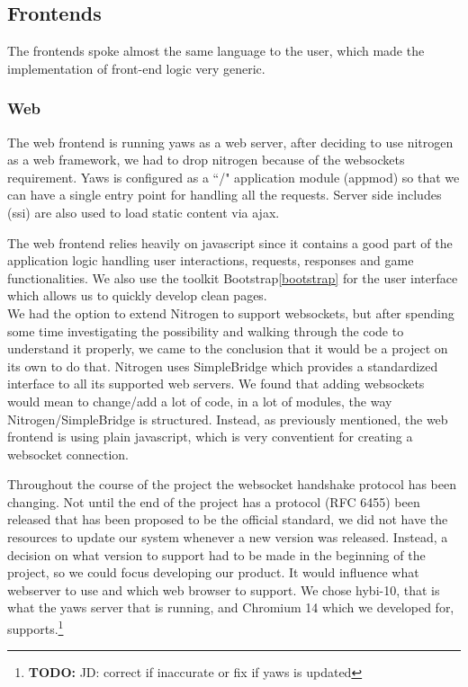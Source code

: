 \documentclass[11pt,a4paper]{report}
\newcommand{\todo}[1]{\footnote{{\color{red} {\bf TODO:} #1}}}
\begin{document}
\subsection{Frontends}
\label{sec:frontends}
The frontends spoke almost the same language to the user, which made the
implementation of front-end logic very generic.

\subsubsection{Web}
The web frontend is running yaws as a web server, after deciding to use nitrogen
as a web framework, we had to drop nitrogen because of the websockets
requirement. Yaws is configured as a ``/" application module (appmod) so that we can have a single entry point for handling all the requests. Server side includes (ssi) are also used to load static content via ajax.

The web frontend relies heavily on javascript since it contains a good part of the application logic handling user interactions, requests, responses and game functionalities. We also use the toolkit Bootstrap\ref{bootstrap} for the user interface which allows us to quickly develop clean pages.\\

We had the option to extend Nitrogen to support websockets, but after spending
some time investigating the possibility and walking through the code to
understand it properly, we came to the conclusion that it would be a project on
its own to do that. Nitrogen uses SimpleBridge which provides a standardized
interface to all its supported web servers. We found that adding websockets
would mean to change/add a lot of code, in a lot of modules, the way
Nitrogen/SimpleBridge is structured. Instead, as previously mentioned, the web
frontend is using plain javascript, which is very conventient for creating a
websocket connection.

Throughout the course of the project the websocket handshake protocol has
been changing.
Not until the end of the project has a protocol (RFC 6455) been released that
has been proposed to be the official standard, we did not have the resources
to update our system whenever a new version was released. Instead, a decision
on what version to support had to be made in the beginning of the project, so we
could focus developing our product.
It would influence what webserver to use and which web browser to support. We
chose hybi-10, that is what the yaws server that is running, and Chromium 14
which we developed for, supports.\todo{JD: correct if inaccurate or fix if yaws is updated}
\end{document}
